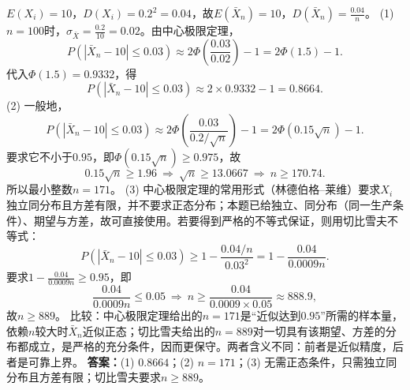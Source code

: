 \ifshowsolutions%
$E(X_i)=10$，$D(X_i)=0.2^2=0.04$，故$E(\bar X_n)=10$，$D(\bar X_n)=\frac{0.04}{n}$。
(1) $n=100$时，$\sigma_{\bar X}=\frac{0.2}{10}=0.02$。由中心极限定理，
\[
P(|\bar X_n-10|\leq0.03)
\approx2\Phi\!\left(\frac{0.03}{0.02}\right)-1
=2\Phi(1.5)-1.
\]
代入$\Phi(1.5)=0.9332$，得
\[
P(|\bar X_n-10|\leq0.03)\approx2\times0.9332-1=0.8664.
\]
(2) 一般地，
\[
P(|\bar X_n-10|\leq0.03)
\approx2\Phi\!\left(\frac{0.03}{0.2/\sqrt n}\right)-1
=2\Phi(0.15\sqrt n)-1.
\]
要求它不小于$0.95$，即$\Phi(0.15\sqrt n)\geq0.975$，故
\[
0.15\sqrt n\geq1.96
\ \Longrightarrow\ \sqrt n\geq13.0667
\ \Longrightarrow\ n\geq170.74.
\]
所以最小整数$n=171$。
(3) 中心极限定理的常用形式（林德伯格--莱维）要求$X_i$独立同分布且方差有限，并不要求正态分布；本题已给独立、同分布（同一生产条件）、期望与方差，故可直接使用。若要得到严格的不等式保证，则用切比雪夫不等式：
\[
P(|\bar X_n-10|\leq0.03)\geq1-\frac{0.04/n}{0.03^2}
=1-\frac{0.04}{0.0009n}.
\]
要求$1-\frac{0.04}{0.0009n}\geq0.95$，即
\[
\frac{0.04}{0.0009n}\leq0.05
\ \Longrightarrow\ n\geq\frac{0.04}{0.0009\times0.05}\approx888.9,
\]
故$n\geq889$。
比较：中心极限定理给出的$n=171$是“近似达到$0.95$”所需的样本量，依赖$n$较大时$\bar X_n$近似正态；切比雪夫给出的$n=889$对一切具有该期望、方差的分布都成立，是严格的充分条件，因而更保守。两者含义不同：前者是近似精度，后者是可靠上界。
\textbf{答案：}(1) $0.8664$；(2) $n=171$；(3) 无需正态条件，只需独立同分布且方差有限；切比雪夫要求$n\geq889$。

\vspace{0.4cm}

\else \answerarea[10] \fi%
